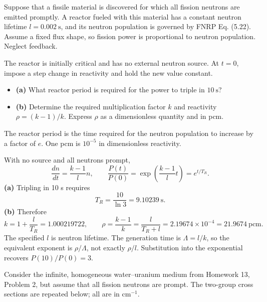 


Suppose that a fissile material is discovered for which all fission
neutrons are emitted promptly. A reactor fueled with this material has a
constant neutron lifetime \(l=0.002~\mathrm{s}\), and its neutron
population is governed by FNRP Eq. (5.22). Assume a fixed flux shape, so
fission power is proportional to neutron population. Neglect feedback.

The reactor is initially critical and has no external neutron source. At
\(t=0\), impose a step change in reactivity and hold the new value
constant.

\begin{itemize}
\setlength{\itemsep}{0pt}\setlength{\parskip}{0pt}
\item
  \textbf{(a)} What reactor period is required for the power to triple
  in \(10~\mathrm{s}\)?
\item
  \textbf{(b)} Determine the required multiplication factor \(k\) and
  reactivity \(\rho=(k-1)/k\). Express \(\rho\) as a dimensionless
  quantity and in pcm.
\end{itemize}

The reactor period is the time required for the neutron population to
increase by a factor of \(e\). One pcm is \(10^{-5}\) in dimensionless
reactivity.


\begin{adaptedsolution}
With no source and all neutrons prompt,
\[
\frac{dn}{dt}=\frac{k-1}{l}n,\qquad
\frac{P(t)}{P(0)}=\exp\!\left(\frac{k-1}{l}t\right)=e^{t/T_R}.
\]
\textbf{(a)} Tripling in 10 s requires
\[
\boxed{T_R=\frac{10}{\ln3}=9.10239~\mathrm{s}.}
\]
\textbf{(b)} Therefore
\[
\boxed{k=1+\frac{l}{T_R}=1.000219722,}
\qquad
\boxed{\rho=\frac{k-1}{k}=\frac{l}{T_R+l}
=2.19674\times10^{-4}=21.9674~\mathrm{pcm}.}
\]
The specified $l$ is neutron lifetime. The generation time is $\Lambda=l/k$, so the equivalent exponent is $\rho/\Lambda$, not exactly $\rho/l$. Substitution into the exponential recovers $P(10)/P(0)=3$.
\end{adaptedsolution}

\newpage


Consider the infinite, homogeneous water--uranium medium from Homework
13, Problem 2, but assume that all fission neutrons are prompt. The
two-group cross sections are repeated below; all are in
\(\mathrm{cm^{-1}}\).

